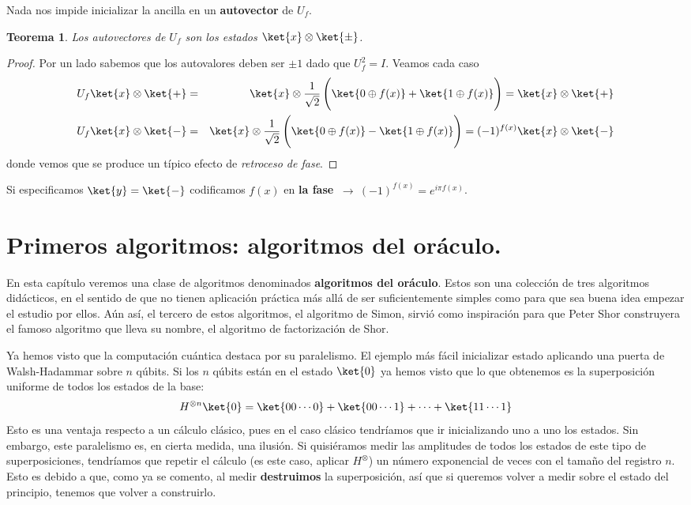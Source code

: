 \documentclass[a4paper,11pt]{book} %
\newtheorem{teorema_contador}{Teorema}
\newcommand{\Teorema}[1]{
		\begin{mybox_gray2}{}
			\begin{teorema_contador}
				 #1 
			\end{teorema_contador} 
		\end{mybox_gray2}
	}
\numberwithin{equation}{chapter}
\begin{document}
Nada nos impide inicializar la ancilla en un \textbf{autovector} de $U_f$. 

	\Teorema{
	Los autovectores de $U_f$ son los estados $\ket{x}\otimes \ket{\pm}$.
	}
	
	\begin{proof}
	Por un lado sabemos que los autovalores deben ser $\pm 1$ dado que $U_f^2 = I$. Veamos cada caso
	\begin{eqnarray}
	U_f\ket{x}\otimes \ket{+} &=& \ket{x}\otimes \frac{1}{\sqrt{2}}\left( \rule{0mm}{6mm}\ket{0\oplus f(x)}+\ket{1\oplus f(x)} \right) 
	= 	\ket{x}\otimes \ket{+} \nonumber\\
	U_f\ket{x}\otimes \ket{-} &=& \ket{x}\otimes \frac{1}{\sqrt{2}}\left( \rule{0mm}{6mm} \ket{0\oplus f(x)}-\ket{1\oplus f(x)}\right) 
	= (-1)^{f(x)} \ket{x}\otimes \ket{-} \nonumber
	\end{eqnarray}
	donde vemos que se produce un típico efecto de \textit{retroceso de fase}.
	\end{proof}

Si especificamos $\ket{y} = \ket{-}$ codificamos $f(x)$ en \textbf{la fase} $~\to ~(-1)^{f(x)} = e^{i\pi f(x)}$.




\chapter{Primeros algoritmos: algoritmos del oráculo.}

En esta capítulo veremos una clase de algoritmos denominados \textbf{algoritmos del oráculo}. Estos son una colección de tres algoritmos didácticos, en el sentido de que no tienen aplicación práctica más allá de ser suficientemente simples como para que sea buena idea empezar el estudio por ellos. Aún así, el tercero de estos algoritmos, el algoritmo de Simon, sirvió como inspiración para que Peter Shor construyera el famoso algoritmo que lleva su nombre, el algoritmo de factorización de Shor.

Ya hemos visto que la computación cuántica destaca por su paralelismo. El ejemplo más fácil inicializar estado aplicando una puerta de Walsh-Hadammar sobre $n$ qúbits. Si los $n$ qúbits están en el estado $\ket{0}$ ya hemos visto que lo que obtenemos es la superposición uniforme de todos los estados de la base:
	\begin{equation}
	H^{\otimes n} \ket{0} = \ket{00\cdots0} + \ket{00\cdots1} + \cdots + \ket{11\cdots 1}
	\end{equation}
Esto es una ventaja respecto a un cálculo clásico, pues en el caso clásico tendríamos que ir inicializando uno a uno los estados. Sin embargo, este paralelismo es, en cierta medida, una ilusión.  Si quisiéramos medir las amplitudes de todos los estados de este tipo de superposiciones, tendríamos que repetir el cálculo (es este caso, aplicar $H^{\otimes}$) un número exponencial de veces con el tamaño del registro $n$. Esto es debido a que, como ya se comento, al medir \textbf{destruimos} la superposición, así que si queremos volver a medir sobre el estado del principio, tenemos que volver a construirlo. 
\end{document}

